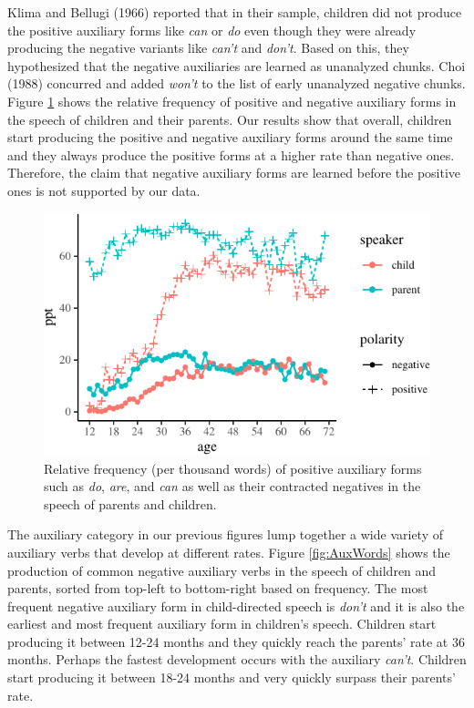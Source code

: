 \documentclass[man,floatsintext,draftall]{apa6}
\begin{document}
Klima and Bellugi (1966) reported that in their sample, children did not produce the positive auxiliary forms like \emph{can} or \emph{do} even though they were already producing the negative variants like \emph{can't} and \emph{don't}. Based on this, they hypothesized that the negative auxiliaries are learned as unanalyzed chunks. Choi (1988) concurred and added \emph{won't} to the list of early unanalyzed negative chunks. Figure \ref{fig:auxRelFreq} shows the relative frequency of positive and negative auxiliary forms in the speech of children and their parents. Our results show that overall, children start producing the positive and negative auxiliary forms around the same time and they always produce the positive forms at a higher rate than negative ones. Therefore, the claim that negative auxiliary forms are learned before the positive ones is not supported by our data.

\begin{figure}
\centering
\includegraphics{negation_production_files/figure-latex/auxRelFreq-1.pdf}
\caption{\label{fig:auxRelFreq}Relative frequency (per thousand words) of positive auxiliary forms such as \emph{do}, \emph{are}, and \emph{can} as well as their contracted negatives in the speech of parents and children.}
\end{figure}

The auxiliary category in our previous figures lump together a wide variety of auxiliary verbs that develop at different rates. Figure \ref{fig:AuxWords} shows the production of common negative auxiliary verbs in the speech of children and parents, sorted from top-left to bottom-right based on frequency. The most frequent negative auxiliary form in child-directed speech is \emph{don't} and it is also the earliest and most frequent auxiliary form in children's speech. Children start producing it between 12-24 months and they quickly reach the parents' rate at 36 months. Perhaps the fastest development occurs with the auxiliary \emph{can't}. Children start producing it between 18-24 months and very quickly surpass their parents' rate.
\end{document}
